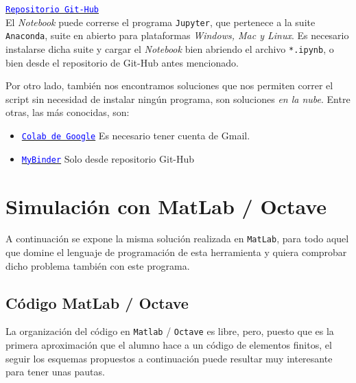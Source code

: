\documentclass[spanish,a4paper,12pt]{article}
\begin{document}
\href{https://github.com/juanjosearribas/met_comp}{\textcolor{blue}{\texttt{Repositorio Git-Hub}}}\\

El \emph{Notebook} puede correrse el programa \texttt{Jupyter}, que pertenece a la suite \texttt{Anaconda}, suite en abierto para plataformas \emph{Windows, Mac y Linux}. Es necesario instalarse dicha suite y cargar el \emph{Notebook} bien abriendo el archivo \texttt{*.ipynb}, o bien desde el repositorio de Git-Hub antes mencionado.

Por otro lado, también nos encontramos soluciones que nos permiten correr el script sin necesidad de instalar ningún programa, son soluciones \emph{en la nube}. Entre otras, las más conocidas, son:

\begin{itemize}
\item  \href{https://colab.research.google.com}{\textcolor{blue}{\texttt{Colab de Google}}} Es necesario tener cuenta de Gmail.
\item  \href{http://mybinder.org/}{\textcolor{blue}{\texttt{MyBinder}}} Solo desde repositorio Git-Hub
\end{itemize}




\clearpage
\appendix
{}
\section{Simulación con MatLab / Octave}
\label{sec:matlab}

A continuación se expone la misma solución realizada en \texttt{MatLab}, para todo aquel que domine el lenguaje de programación de esta herramienta y quiera comprobar dicho problema también con este programa.

\subsection*{Código MatLab / Octave}
\label{sec:esq}

La organización del código en \texttt{Matlab} / \texttt{Octave} es libre, pero, puesto que es la primera aproximación que el alumno hace a un código de elementos finitos, el seguir los esquemas propuestos a continuación puede resultar muy interesante para tener unas pautas.
\end{document}
